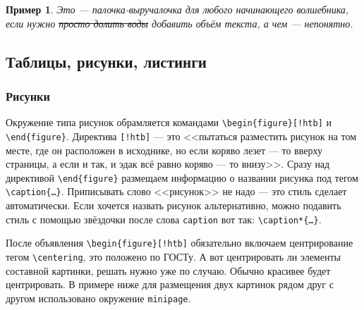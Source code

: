 \documentclass[14pt, russian]{scrartcl}
\newcounter{cExample}
\newtheorem{Example}{Пример}[cExample]
\begin{document}
\begin{Example}
Это --- палочка-выручалочка для любого начинающего волшебника, если нужно \sout{просто долить воды} добавить объём текста, а чем --- непонятно. 
\end{Example}

\subsection{Таблицы, рисунки, листинги}

\subsubsection{Рисунки}

Окружение типа рисунок обрамляется командами \texttt{\textbackslash begin\{figure\}[!htb]} и \texttt{\textbackslash end\{figure\}}. Директива \texttt{[!htb]} --- это <<пытаться разместить рисунок на том месте, где он расположен в исходнике, но если коряво лезет --- то вверху страницы, а если и так, и эдак всё равно коряво --- то внизу>>. Сразу над директивой \texttt{\textbackslash end\{figure\}} размещаем информацию о названии рисунка под тегом \texttt{\textbackslash{caption}\{\dots\}}. Приписывать слово <<рисунок>> не надо --- это стиль сделает автоматически. Если хочется назвать рисунок альтернативно, можно подавить стиль с помощью звёздочки после слова \texttt{caption} вот так: \texttt{\textbackslash{caption*}\{\dots\}}.

После объявления \texttt{\textbackslash begin\{figure\}[!htb]} обязательно включаем центрирование тегом \texttt{\textbackslash centering}, это положено по ГОСТу. А вот центрировать ли элементы составной картинки, решать нужно уже по случаю. Обычно красивее будет центрировать. В примере ниже для размещения двух картинок рядом друг с другом использовано окружение \texttt{minipage}. 
\end{document}
